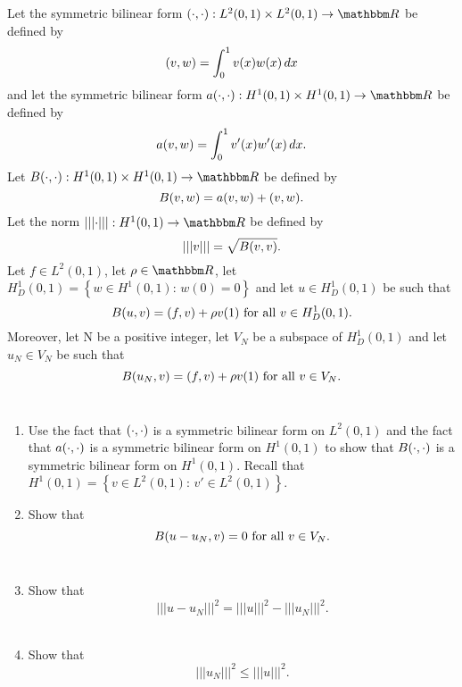 
Let the symmetric bilinear form $\ip{\cdot,\cdot}:L^2(0,1)\times L^2(0,1)\to\R$ be defined by
\[
(v,w)=\int_0^1v(x)w(x)\,dx
\]
and let the symmetric bilinear form $a\ip{\cdot,\cdot}:H^1(0,1)\times H^1(0,1)\to\R$ be defined by
\[
a(v,w)=\int_0^1v'(x)w'(x)\,dx.
\]
Let $B\ip{\cdot,\cdot}:H^1(0,1)\times H^1(0,1)\to\R$ be defined by
\[
B(v,w)=a(v,w)+(v,w).
\]
Let the norm $\left|\left|\left|\cdot\right|\right|\right|:H^1(0,1)\to\R$ be defined by
\[
\left|\left|\left|v\right|\right|\right|=\sqrt{B(v,v)}.
\]
Let $f\in L^2(0,1)$, let $\rho\in\R$, let $H^1_D(0,1)=\left\{w\in H^1(0,1):\,w(0)=0\right\}$ and let $u\in H^1_D(0,1)$ be such that
\[
B(u,v)=(f,v)+\rho v(1)\mbox{ for all }v\in H^1_D(0,1).
\]
Moreover, let N be a positive integer, let $V_N$ be a subspace of $H^1_D(0,1)$ and let $u_N\in V_N$ be such that
\[
B(u_N,v)=(f,v)+\rho v(1)\mbox{ for all }v\in V_N.
\]
\\
\begin{enumerate}
\item Use the fact that $(\cdot,\cdot)$ is a symmetric bilinear form on $L^2(0,1)$ and the fact that $a(\cdot,\cdot)$ is a symmetric bilinear form on $H^1(0,1)$ to show that $B(\cdot,\cdot)$ is a symmetric bilinear form on $H^1(0,1)$. Recall that $H^1(0,1)=\left\{v\in L^2(0,1):\,v'\in L^2(0,1)\right\}$.
\\
\item Show that
\[
B(u-u_N,v)=0\mbox{ for all }v\in V_N.
\]
\\
\item Show that
\[
\left|\left|\left|u-u_N\right|\right|\right|^2=\left|\left|\left|u\right|\right|\right|^2-\left|\left|\left|u_N\right|\right|\right|^2.
\]
\\
\item Show that
\[
\left|\left|\left|u_N\right|\right|\right|^2\le\left|\left|\left|u\right|\right|\right|^2.
\]
\end{enumerate}




